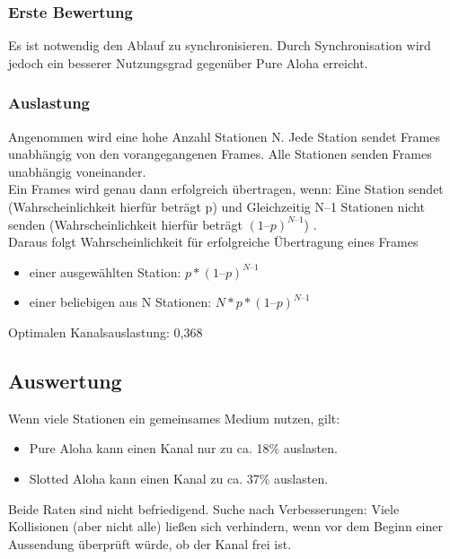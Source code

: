 \documentclass{article} %
\begin{document}
\subsubsection{Erste Bewertung}
Es ist notwendig den Ablauf zu synchronisieren. Durch Synchronisation wird jedoch ein besserer Nutzungsgrad gegenüber Pure Aloha erreicht.

\subsubsection{Auslastung}
Angenommen wird eine hohe Anzahl Stationen N. Jede Station sendet Frames unabhängig von den vorangegangenen Frames. Alle Stationen senden Frames unabhängig voneinander.\\
Ein Frames wird genau dann erfolgreich übertragen, wenn: Eine Station sendet (Wahrscheinlichkeit hierfür beträgt p) und Gleichzeitig N–1 Stationen nicht senden (Wahrscheinlichkeit hierfür beträgt $(1–p)^{N–1}$) .\\
Daraus folgt Wahrscheinlichkeit für erfolgreiche Übertragung eines Frames 
	\begin{itemize}
	\item einer ausgewählten Station: $p*(1–p)^{N–1}$
	\item einer beliebigen aus N Stationen: $N*p*(1–p)^{N–1}$
	\end{itemize}
Optimalen Kanalsauslastung: 0,368

\subsection{Auswertung}
Wenn viele Stationen ein gemeinsames Medium nutzen, gilt: 
	\begin{itemize}
	\item Pure Aloha kann einen Kanal nur zu ca. 18$\%$ auslasten. 
	\item Slotted Aloha kann einen Kanal zu ca. 37$\%$ auslasten. 	
	\end{itemize}
Beide Raten sind nicht befriedigend. Suche nach Verbesserungen: Viele Kollisionen (aber nicht alle) ließen sich verhindern, wenn vor dem Beginn einer Aussendung überprüft würde, ob der Kanal frei ist. 
\end{document}
